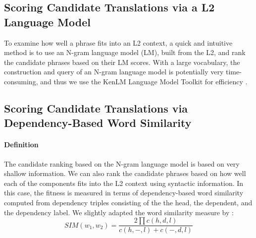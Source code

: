 \documentclass[11pt]{article}
\begin{document}

\subsection{Scoring Candidate Translations via a L2 Language Model}
\label{sec:l2model}

To examine how well a phrase fits into an L2 context, a quick and intuitive method is to use an N-gram language model (LM), built from the L2, and rank the candidate phrases based on their LM scores. With a large vocabulary, the construction and query of an N-gram language model is potentially very time-consuming, and thus we use the KenLM Language Model Toolkit for efficiency \cite{heafield:kenlm:11}.


\subsection{Scoring Candidate Translations via Dependency-Based Word Similarity}
\label{sec:dependencySIM}

\paragraph{Definition} The candidate ranking based on the N-gram language model is based on very shallow information. We can also rank the candidate phrases based on how well each of the components fits into the L2 context using syntactic information. In this case, the fitness is measured in terms of dependency-based word similarity computed from dependency triples consisting of the the head, the dependent, and the dependency label. We slightly adapted the word similarity measure by :\\

\begin{equation}
SIM(w_1,w_2) = \frac{2 \prod c(h,d,l)} 
{c(h,-,l) + c(-,d,l)}
\end{equation}
\end{document}
